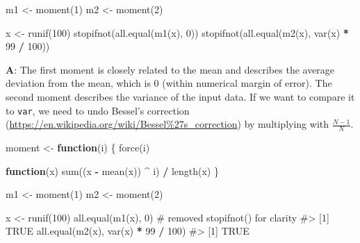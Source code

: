 \documentclass[
]{krantz}
\makeatletter
\newenvironment{Shaded}{\begin{snugshade}}{\end{snugshade}}
\newcommand{\CommentTok}[1]{\textcolor[rgb]{0.56,0.35,0.01}{\textit{#1}}}
\newcommand{\ControlFlowTok}[1]{\textcolor[rgb]{0.13,0.29,0.53}{\textbf{#1}}}
\newcommand{\DecValTok}[1]{\textcolor[rgb]{0.00,0.00,0.81}{#1}}
\newcommand{\KeywordTok}[1]{\textcolor[rgb]{0.13,0.29,0.53}{\textbf{#1}}}
\newcommand{\NormalTok}[1]{#1}
\newcommand{\OperatorTok}[1]{\textcolor[rgb]{0.81,0.36,0.00}{\textbf{#1}}}
\newcommand{\StringTok}[1]{\textcolor[rgb]{0.31,0.60,0.02}{#1}}
\renewcommand{\href}[2]{#2 (\url{#1})}
\newenvironment{kframe}{%
\medskip{}
\setlength{\fboxsep}{.8em}
 \def\at@end@of@kframe{}%
 \ifinner\ifhmode%
  \def\at@end@of@kframe{\end{minipage}}%
  \begin{minipage}{\columnwidth}%
 \fi\fi%
 \def\FrameCommand##1{\hskip\@totalleftmargin \hskip-\fboxsep
 \colorbox{shadecolor}{##1}\hskip-\fboxsep
     \hskip-\linewidth \hskip-\@totalleftmargin \hskip\columnwidth}%
 \MakeFramed {\advance\hsize-\width
   \@totalleftmargin\z@ \linewidth\hsize
   \@setminipage}}%
 {\par\unskip\endMakeFramed%
 \at@end@of@kframe}
\renewenvironment{Shaded}{\begin{kframe}}{\end{kframe}}
\renewcommand{\KeywordTok} [1]{\textcolor[rgb]{0.00,0.44,0.13}{{#1}}}
\renewcommand{\DecValTok}  [1]{\textcolor[rgb]{0.25,0.63,0.44}{{#1}}}
\renewcommand{\StringTok}  [1]{\textcolor[rgb]{0.25,0.44,0.63}{{#1}}}
\renewcommand{\CommentTok} [1]{\textcolor[rgb]{0.38,0.63,0.69}{{#1}}}
\renewcommand{\NormalTok}  [1]{{#1}}
\makeatother
\begin{document}
\begin{Shaded}
\begin{Highlighting}[]
\NormalTok{m1 <-}\StringTok{ }\KeywordTok{moment}\NormalTok{(}\DecValTok{1}\NormalTok{)}
\NormalTok{m2 <-}\StringTok{ }\KeywordTok{moment}\NormalTok{(}\DecValTok{2}\NormalTok{)}

\NormalTok{x <-}\StringTok{ }\KeywordTok{runif}\NormalTok{(}\DecValTok{100}\NormalTok{)}
\KeywordTok{stopifnot}\NormalTok{(}\KeywordTok{all.equal}\NormalTok{(}\KeywordTok{m1}\NormalTok{(x), }\DecValTok{0}\NormalTok{))}
\KeywordTok{stopifnot}\NormalTok{(}\KeywordTok{all.equal}\NormalTok{(}\KeywordTok{m2}\NormalTok{(x), }\KeywordTok{var}\NormalTok{(x) }\OperatorTok{*}\StringTok{ }\DecValTok{99} \OperatorTok{/}\StringTok{ }\DecValTok{100}\NormalTok{))}
\end{Highlighting}
\end{Shaded}

\textbf{{A}}: The first moment is closely related to the mean and describes the average deviation from the mean, which is 0 (within numerical margin of error). The second moment describes the variance of the input data. If we want to compare it to \texttt{var}, we need to undo \href{https://en.wikipedia.org/wiki/Bessel\%27s_correction}{Bessel's correction} by multiplying with \(\frac{N-1}{N}\).

\begin{Shaded}
\begin{Highlighting}[]
\NormalTok{moment <-}\StringTok{ }\ControlFlowTok{function}\NormalTok{(i) \{}
  \KeywordTok{force}\NormalTok{(i)}
  
  \ControlFlowTok{function}\NormalTok{(x) }\KeywordTok{sum}\NormalTok{((x }\OperatorTok{-}\StringTok{ }\KeywordTok{mean}\NormalTok{(x)) }\OperatorTok{^}\StringTok{ }\NormalTok{i) }\OperatorTok{/}\StringTok{ }\KeywordTok{length}\NormalTok{(x)}
\NormalTok{\}}

\NormalTok{m1 <-}\StringTok{ }\KeywordTok{moment}\NormalTok{(}\DecValTok{1}\NormalTok{)}
\NormalTok{m2 <-}\StringTok{ }\KeywordTok{moment}\NormalTok{(}\DecValTok{2}\NormalTok{)}

\NormalTok{x <-}\StringTok{ }\KeywordTok{runif}\NormalTok{(}\DecValTok{100}\NormalTok{)}
\KeywordTok{all.equal}\NormalTok{(}\KeywordTok{m1}\NormalTok{(x), }\DecValTok{0}\NormalTok{)  }\CommentTok{# removed stopifnot() for clarity}
\CommentTok{#> [1] TRUE}
\KeywordTok{all.equal}\NormalTok{(}\KeywordTok{m2}\NormalTok{(x), }\KeywordTok{var}\NormalTok{(x) }\OperatorTok{*}\StringTok{ }\DecValTok{99} \OperatorTok{/}\StringTok{ }\DecValTok{100}\NormalTok{)}
\CommentTok{#> [1] TRUE}
\end{Highlighting}
\end{Shaded}
\end{document}
